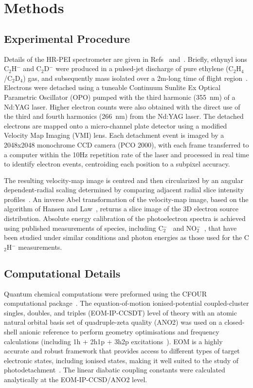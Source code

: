 \documentclass[aip,graphicx]{revtex4-1}
\begin{document}
\section{Methods}
\subsection{Experimental Procedure}
Details of the HR-PEI spectrometer are given in Refs~ and~. Briefly, ethynyl ions C$_2$H$^-$ and C$_2$D$^-$ were produced in a pulsed-jet discharge of pure ethylene (C$_2$H$_4$/C$_2$D$_4$) gas, and subsequently mass isolated over a 2m-long time of flight region~\cite{ded01}. Electrons were detached using a tuneable Continuum Sunlite Ex Optical Parametric Oscillator (OPO) pumped with the third harmonic (355~nm) of a Nd:YAG laser. Higher electron counts were also obtained with the direct use of the third and fourth harmonics (266~nm) from the Nd:YAG laser. The detached electrons are mapped onto a micro-channel plate detector using a modified Velocity Map Imaging (VMI) lens. Each detachment event is imaged by a 2048x2048 monochrome CCD camera (PCO 2000), with each frame transferred to a computer within the 10Hz repetition rate of the laser and processed in real time to identify electron events, centroiding each position to a subpixel accuracy.

The resulting velocity-map image is centred and then circularized by an angular dependent-radial scaling determined by comparing adjacent radial slice intensity profiles~\cite{gas17}. An inverse Abel transformation of the velocity-map image, based on the algorithm of Hansen and Law~\cite{han85,hic19}, returns a slice image of the 3D electron source distribution. Absolute energy calibration of the photoelectron spectra is achieved using published measurements of species, including C$_2^-$~\cite{law19b} and NO$_2^-$~\cite{law19}, that have been studied under similar conditions and photon energies as those used for the C$_2$H$^-$ measurements.



\subsection{Computational Details}
Quantum chemical computations were preformed using the CFOUR computational package~\cite{dev20}. The equation-of-motion ionised-potential coupled-cluster singles, doubles, and triples (EOM-IP-CCSDT) level of theory with an atomic natural orbital basis set of quadruple-zeta quality (ANO2) was used on a closed-shell anionic reference to perform geometry optimisations and frequency calculations (including 1h + 2h1p + 3h2p excitations~\cite{mat16}). EOM is a highly accurate and robust framework that provides access to different types of target electronic states, including ionised states, making it well suited to the study of photodetachment~\cite{gul21b,and22,bar07}. The linear diabatic coupling constants were calculated analytically at the EOM-IP-CCSD/ANO2 level.
\end{document}
